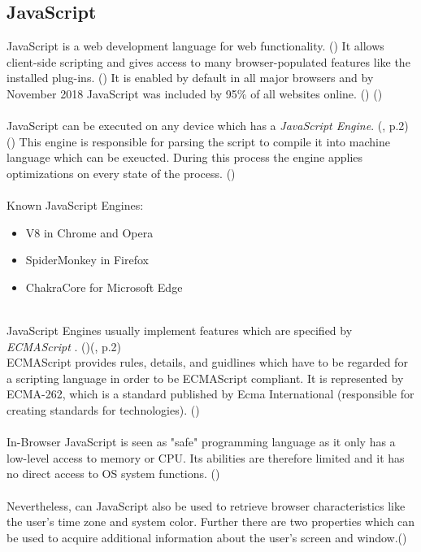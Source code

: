 \subsection{JavaScript}\label{JS}
JavaScript is a web development language for web functionality. (\textcite{wood}) It allows client-side scripting and gives access to many browser-populated features like the installed plug-ins. (\textcite{amiunique}) It is enabled by default in all major browsers and by November 2018 JavaScript was included by 95\% of all websites online. (\textcite{jsinfo}) (\textcite{w3techs18})\\\\
JavaScript can be executed on any device which has a \textit{JavaScript Engine}. (\textcite{mulazzani13}, p.2) (\textcite{jsinfo}) This engine is responsible for parsing the script to compile it into machine language which can be exeucted. During this process the engine applies optimizations on every state of the process. (\textcite{jsinfo})\\\\
Known JavaScript Engines:
\begin{itemize}
	\item V8 in Chrome and Opera
	\item SpiderMonkey in Firefox
	\item ChakraCore for Microsoft Edge\\\\
\end{itemize}
JavaScript Engines usually implement features which are specified by \textit{ECMAScript} .  (\textcite{jsinfo})(\textcite{mulazzani13}, p.2)\\
ECMAScript provides rules, details, and guidlines which have to be regarded for a scripting language in order to be ECMAScript compliant. It is represented by ECMA-262, which is a standard published by Ecma International (responsible for creating standards for technologies). (\textcite{aranda17})\\\\
In-Browser JavaScript is seen as "safe" programming language as it only has a low-level access to memory or CPU. Its abilities are therefore limited and it has no direct access to OS system functions. (\textcite{jsinfo})\\\\
Nevertheless, can JavaScript also be used to retrieve browser characteristics like the user's time zone and system color. Further there are two properties which can be used to acquire additional information about the user's screen and window.(\textcite{web17})\\\\
